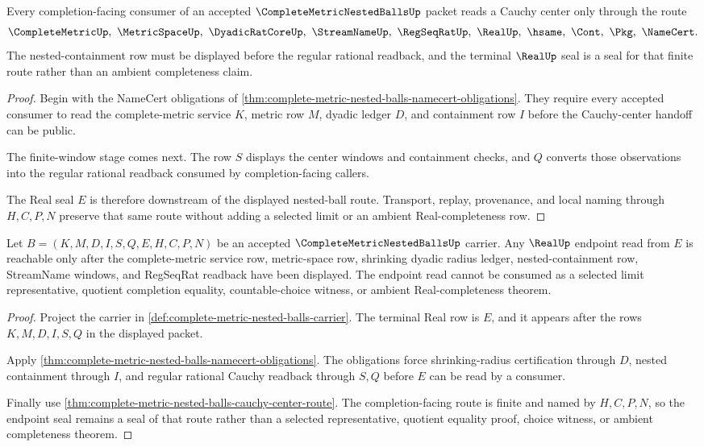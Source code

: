\begin{theorem}
\label{thm:complete-metric-nested-balls-cauchy-center-route}
Every completion-facing consumer of an accepted $\CompleteMetricNestedBallsUp$ packet reads a Cauchy center only through the route
$$
\CompleteMetricUp,\ \MetricSpaceUp,\ \DyadicRatCoreUp,\ \StreamNameUp,\ \RegSeqRatUp,\ \RealUp,\ \hsame,\ \Cont,\ \Pkg,\ \NameCert .
$$
The nested-containment row must be displayed before the regular rational readback, and the terminal $\RealUp$ seal is a seal for that finite route rather than an ambient completeness claim.
\end{theorem}
\begin{proof}
Begin with the NameCert obligations of \autoref{thm:complete-metric-nested-balls-namecert-obligations}. They require every accepted consumer to read the complete-metric service $K$, metric row $M$, dyadic ledger $D$, and containment row $I$ before the Cauchy-center handoff can be public.

The finite-window stage comes next. The row $S$ displays the center windows and containment checks, and $Q$ converts those observations into the regular rational readback consumed by completion-facing callers.

The Real seal $E$ is therefore downstream of the displayed nested-ball route. Transport, replay, provenance, and local naming through $H,C,P,N$ preserve that same route without adding a selected limit or an ambient Real-completeness row.
\end{proof}

\begin{theorem}
\label{thm:complete-metric-nested-balls-real-seal-nonescape}
Let $B=(K,M,D,I,S,Q,E,H,C,P,N)$ be an accepted $\CompleteMetricNestedBallsUp$ carrier. Any $\RealUp$ endpoint read from $E$ is reachable only after the complete-metric service row, metric-space row, shrinking dyadic radius ledger, nested-containment row, StreamName windows, and RegSeqRat readback have been displayed. The endpoint read cannot be consumed as a selected limit representative, quotient completion equality, countable-choice witness, or ambient Real-completeness theorem.
\end{theorem}
\begin{proof}
Project the carrier in \autoref{def:complete-metric-nested-balls-carrier}. The terminal Real row is $E$, and it appears after the rows $K,M,D,I,S,Q$ in the displayed packet.

Apply \autoref{thm:complete-metric-nested-balls-namecert-obligations}. The obligations force shrinking-radius certification through $D$, nested containment through $I$, and regular rational Cauchy readback through $S,Q$ before $E$ can be read by a consumer.

Finally use \autoref{thm:complete-metric-nested-balls-cauchy-center-route}. The completion-facing route is finite and named by $H,C,P,N$, so the endpoint seal remains a seal of that route rather than a selected representative, quotient equality proof, choice witness, or ambient completeness theorem.
\end{proof}

